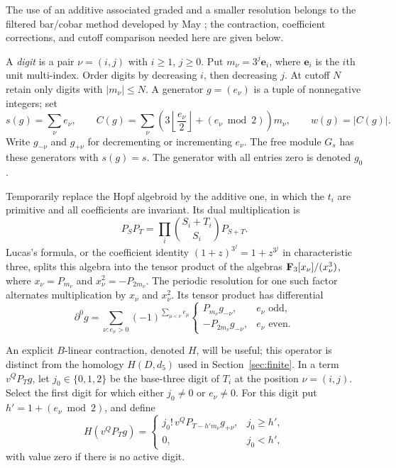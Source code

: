 The use of an additive associated graded and a smaller resolution belongs
to the filtered bar/cobar method developed by May
\cite[Sections~4, 6--7]{MayHopfCohomology}; the contraction, coefficient
corrections, and cutoff comparison needed here are given below.

A \emph{digit} is a pair $\nu=(i,j)$ with $i\geq1$, $j\geq0$.
Put $m_\nu=3^j\mathbf e_i$, where $\mathbf e_i$ is the $i$th unit
multi-index.  Order digits by decreasing $i$, then decreasing $j$.
At cutoff $N$ retain only digits with $|m_\nu|\leq N$.
A generator $g=(e_\nu)$ is a tuple of nonnegative integers; set
\begin{equation}\label{alg:generators}
 s(g)=\sum_\nu e_\nu,\qquad
 C(g)=\sum_\nu\left(3\left\lfloor\frac{e_\nu}{2}\right\rfloor
                         +(e_\nu\bmod2)\right)m_\nu,
 \qquad w(g)=|C(g)|.
\end{equation}
Write $g_{-\nu}$ and $g_{+\nu}$ for decrementing or incrementing
$e_\nu$.  The free module $G_s$ has these generators with $s(g)=s$.
The generator with all entries zero is denoted $g_0$.

Temporarily replace the Hopf algebroid by the additive one, in which
the $t_i$ are primitive and all coefficients are invariant.  Its dual
multiplication is
\[
 P_SP_T=\prod_i\binom{S_i+T_i}{S_i}P_{S+T}.
\]
Lucas's formula, or the coefficient identity
$(1+z)^{3^j}=1+z^{3^j}$ in characteristic three, splits this algebra into
the tensor product of the algebras $\mathbf F_3[x_\nu]/(x_\nu^3)$, where
$x_\nu=P_{m_\nu}$ and $x_\nu^2=-P_{2m_\nu}$.  The periodic resolution
for one such factor alternates multiplication by $x_\nu$ and
$x_\nu^2$.  Its tensor product has differential
\begin{equation}\label{alg:additive-differential}
 \partial^0g=\sum_{\nu:e_\nu>0}
 (-1)^{\sum_{\mu<\nu}e_\mu}
 \begin{cases}
 P_{m_\nu}g_{-\nu},& e_\nu\text{ odd},\\
 -P_{2m_\nu}g_{-\nu},& e_\nu\text{ even}.
 \end{cases}
\end{equation}

An explicit $B$-linear contraction, denoted $H$, will be useful;
this operator is distinct from the homology $H(D,d_5)$ used in
Section~\ref{sec:finite}.  In a term
$v^QP_Tg$, let $j_0\in\{0,1,2\}$ be the base-three digit of $T_i$
at the position $\nu=(i,j)$.  Select the first digit for which either
$j_0\ne0$ or $e_\nu\ne0$.  For this digit put
$h'=1+(e_\nu\bmod2)$, and define
\begin{equation}\label{alg:contraction}
 H(v^QP_Tg)=
 \begin{cases}
 j_0!\,v^QP_{T-h'm_\nu}g_{+\nu},&j_0\geq h',\\
 0,&j_0<h',
 \end{cases}
\end{equation}
with value zero if there is no active digit.

